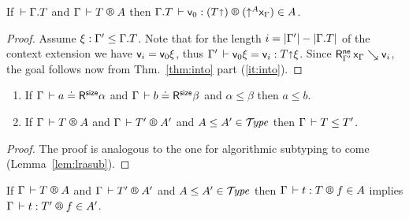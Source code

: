 \documentclass[acmlarge,review,anonymous]{acmart}\settopmatter{printfolios=true}
\begin{document}
\begin{corollary}
  \label{cor:fresh}
  If\/ $\,\vdash \Gamma. T$ and %
  $\RG \Gamma T A$
  then $\LR {\cext \Gamma T} {\ind 0} {(T \slift)} {(\up A \var\Gamma)} A$.
\end{corollary}
\begin{proof}
  Assume $\xi : \Gamma' \leq \Gamma. T$.
  Note that for the length
  $i = |\Gamma'| - |\Gamma. T|$ of the context extension
  we have $\mathsf{v}_{i} = \mathsf{v}_{0} \xi$, thus
  $\Gamma' \,\vdash \mathsf{v}_{0} \xi = \mathsf{v}_{i} : T \mathord{\shortuparrow} \xi$.
  Since $\mathsf{R}^{\mathsf{ne}}_{\Gamma'} \, \mathsf{x}_{\Gamma} \searrow \mathsf{v}_{i}$,
  the goal follows now from Thm.~\ref{thm:into} part (\ref{it:into}).
\end{proof}


\begin{lemma}
\label{lem:lrsub}
\bla
\begin{enumerate}
\item
   If\/ $\Gamma \,\vdash a \doteq \mathsf{R}^{\mathsf{size}} \alpha$ and $\Gamma \,\vdash b \doteq \mathsf{R}^{\mathsf{size}} \beta$ and $\alpha \leq \beta$ then $a \leq b$.
\item
   If\/ $\RG \Gamma T A$ and $\RG \Gamma {T'} {A'}$ and $A \leq A' \in \mathcal{T}\!\mathit{ype}$ then $\Gamma \,\vdash T \leq T'$.
\end{enumerate}
\end{lemma}
\begin{proof}
  The proof is analogous to the one  for algorithmic subtyping to come (Lemma~\ref{lem:lrasub}).
\end{proof}


\begin{lemma}
\label{lem:lrsump}
   If\/ $\RG \Gamma T A$ and $\RG \Gamma {T'} {A'}$ and $A \leq A' \in \mathcal{T}\!\mathit{ype}$ then
   $\LR \Gamma t T f A$ implies $\LR \Gamma t {T'} f {A'}$.
\end{lemma}
\end{document}
